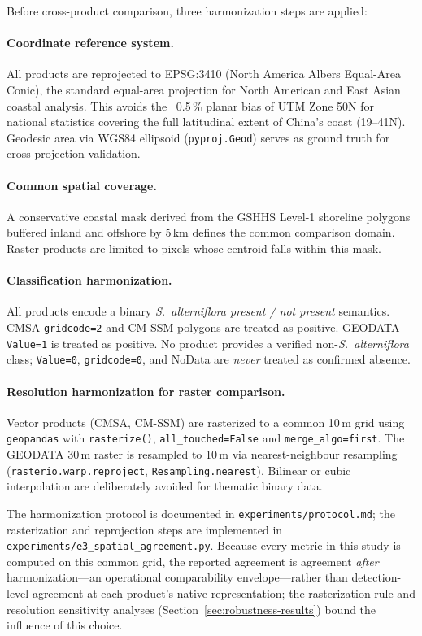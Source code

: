 \documentclass[11pt]{article}
\begin{document}
Before cross-product comparison, three harmonization steps are applied:

\paragraph{Coordinate reference system.} All products are reprojected to EPSG:3410
(North America Albers Equal-Area Conic), the standard equal-area projection for
North American and East Asian coastal analysis. This avoids the ~0.5\,\% planar
bias of UTM Zone 50N for national statistics covering the full latitudinal
extent of China's coast (19--41\textdegree{}N). Geodesic area via WGS84 ellipsoid
(\texttt{pyproj.Geod}) serves as ground truth for cross-projection validation.

\paragraph{Common spatial coverage.} A conservative coastal mask derived from the
GSHHS Level-1 shoreline polygons\citep{wessel_1996_gshhs} buffered inland and
offshore by 5\,km defines the common comparison domain. Raster products are
limited to pixels whose centroid falls within this mask.

\paragraph{Classification harmonization.} All products encode a binary
\textit{S.~alterniflora present / not present} semantics. CMSA \texttt{gridcode=2}
and CM-SSM polygons are treated as positive. GEODATA \texttt{Value=1} is
treated as positive. No product provides a verified non-\textit{S.~alterniflora}
class; \texttt{Value=0}, \texttt{gridcode=0}, and NoData are \emph{never} treated
as confirmed absence.

\paragraph{Resolution harmonization for raster comparison.} Vector products (CMSA,
CM-SSM) are rasterized to a common 10\,m grid using \texttt{geopandas} with
\texttt{rasterize()}, \texttt{all\_touched=False} and \texttt{merge\_algo=first}.
The GEODATA 30\,m raster is resampled to 10\,m via nearest-neighbour
resampling (\texttt{rasterio.warp.reproject}, \texttt{Resampling.nearest}).
Bilinear or cubic interpolation are deliberately avoided for thematic binary
data.

The harmonization protocol is documented in \texttt{experiments/protocol.md};
the rasterization and reprojection steps are implemented in
\texttt{experiments/e3\_spatial\_agreement.py}. Because every metric in this
study is computed on this common grid, the reported agreement is agreement
\emph{after} harmonization---an operational comparability envelope---rather
than detection-level agreement at each product's native representation; the
rasterization-rule and resolution sensitivity analyses
(Section~\ref{sec:robustness-results}) bound the influence of this choice.
\end{document}
